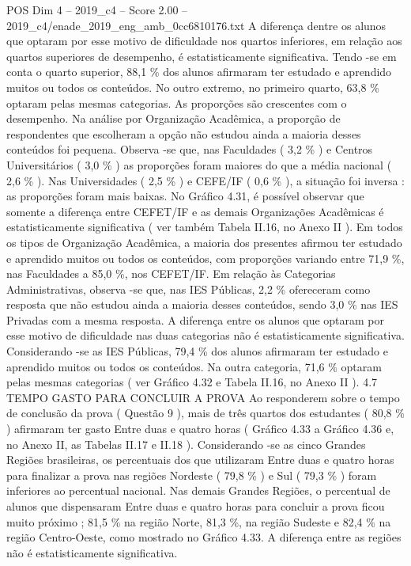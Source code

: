\begin{textsample}{POS Dim 4 – 2019\_c4 – Score 2.00 – 2019\_c4/enade\_2019\_eng\_amb\_0cc6810176.txt}
A diferença dentre os alunos que optaram por esse motivo de dificuldade nos quartos inferiores, em relação aos quartos superiores de desempenho, é estatisticamente significativa.
Tendo -se em conta o quarto superior, 88,1 \% dos alunos afirmaram ter estudado e aprendido muitos ou todos os conteúdos.
No outro extremo, no primeiro quarto, 63,8 \% optaram pelas mesmas categorias.
As proporções são crescentes com o desempenho.
Na análise por Organização Acadêmica, a proporção de respondentes que escolheram a opção não estudou ainda a maioria desses conteúdos foi pequena.
Observa -se que, nas Faculdades ( 3,2 \% ) e Centros Universitários ( 3,0 \% ) as proporções foram maiores do que a média nacional ( 2,6 \% ).
Nas Universidades ( 2,5 \% ) e CEFE/IF ( 0,6 \% ), a situação foi inversa : as proporções foram mais baixas.
No Gráfico 4.31, é possível observar que somente a diferença entre CEFET/IF e as demais Organizações Acadêmicas é estatisticamente significativa ( ver também Tabela II.16, no Anexo II ).
Em todos os tipos de Organização Acadêmica, a maioria dos presentes afirmou ter estudado e aprendido muitos ou todos os conteúdos, com proporções variando entre 71,9 \%, nas Faculdades a 85,0 \%, nos CEFET/IF.
Em relação às Categorias Administrativas, observa -se que, nas IES Públicas, 2,2 \% ofereceram como resposta que não estudou ainda a maioria desses conteúdos, sendo 3,0 \% nas IES Privadas com a mesma resposta.
A diferença entre os alunos que optaram por esse motivo de dificuldade nas duas categorias não é estatisticamente significativa.
Considerando -se as IES Públicas, 79,4 \% dos alunos afirmaram ter estudado e aprendido muitos ou todos os conteúdos.
Na outra categoria, 71,6 \% optaram pelas mesmas categorias ( ver Gráfico 4.32 e Tabela II.16, no Anexo II ). 4.7 TEMPO GASTO PARA CONCLUIR A PROVA Ao responderem sobre o tempo de conclusão da prova ( Questão 9 ), mais de três quartos dos estudantes ( 80,8 \% ) afirmaram ter gasto Entre duas e quatro horas ( Gráfico 4.33 a Gráfico 4.36 e, no Anexo II, as Tabelas II.17 e II.18 ).
Considerando -se as cinco Grandes Regiões brasileiras, os percentuais dos que utilizaram Entre duas e quatro horas para finalizar a prova nas regiões Nordeste ( 79,8 \% ) e Sul ( 79,3 \% ) foram inferiores ao percentual nacional.
Nas demais Grandes Regiões, o percentual de alunos que dispensaram Entre duas e quatro horas para concluir a prova ficou muito próximo ; 81,5 \% na região Norte, 81,3 \%, na região Sudeste e 82,4 \% na região Centro-Oeste, como mostrado no Gráfico 4.33.
A diferença entre as regiões não é estatisticamente significativa.

\end{textsample}
